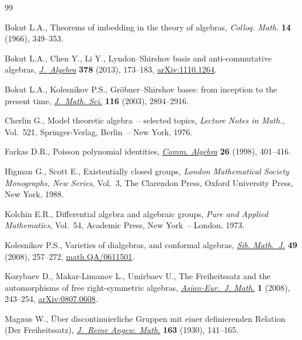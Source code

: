 \documentclass[pdftex]{sigma}
\begin{document}
\begin{thebibliography}{99}
\footnotesize \itemsep=0pt

Bokut L.A., Theorems of imbedding in the theory of algebras, \textit{Colloq.
  Math.} \textbf{14} (1966), 349--353.

Bokut L.A., Chen Y., Li Y., Lyndon--{S}hirshov basis and anti-commutative
  algebras, \href{http://dx.doi.org/10.1016/j.jalgebra.2012.12.017}{\textit{J.~Algebra}} \textbf{378} (2013), 173--183,
  \href{http://arxiv.org/abs/1110.1264}{arXiv:1110.1264}.

Bokut L.A., Kolesnikov P.S., Gr\"obner--{S}hirshov bases: from inception to the
  present time, \href{http://dx.doi.org/10.1023/A:1023490323855}{\textit{J.~Math. Sci.}} \textbf{116} (2003), 2894--2916.

Cherlin G., Model theoretic algebra~-- selected topics, \textit{Lecture Notes
  in Math.}, Vol.~521, Springer-Verlag, Berlin~-- New York, 1976.

Farkas D.R., Poisson polynomial identities, \href{http://dx.doi.org/10.1080/00927879808826136}{\textit{Comm. Algebra}} \textbf{26}
  (1998), 401--416.

Higman G., Scott E., Existentially closed groups, \textit{London Mathematical
  Society Monographs, New Series}, Vol.~3, The Clarendon Press, Oxford
  University Press, New York, 1988.

Kolchin E.R., Dif\/ferential algebra and algebraic groups, \textit{Pure and
  Applied Mathematics}, Vol.~54, Academic Press, New York~-- London, 1973.

Kolesnikov P.S., Varieties of dialgebras, and conformal algebras, \href{http://dx.doi.org/10.1007/s11202-008-0026-8}{\textit{Sib.
  Math.~J.}} \textbf{49} (2008), 257--272, \href{http://arxiv.org/abs/math.QA/0611501}{math.QA/0611501}.

Kozybaev D., Makar-Limanov L., Umirbaev U., The {F}reiheitssatz and the
  automorphisms of free right-symmetric algebras, \href{http://dx.doi.org/10.1142/S1793557108000230}{\textit{Asian-Eur.~J. Math.}}
  \textbf{1} (2008), 243--254, \href{http://arxiv.org/abs/0807.0608}{arXiv:0807.0608}.

Magnus W., \"Uber discontinuierliche Gruppen mit einer def\/inierenden Relation
  (Der Freiheitssatz), \href{http://dx.doi.org/10.1515/crll.1930.163.141}{\textit{J.~Reine Angew. Math.}} \textbf{163} (1930),
  141--165.


\end{thebibliography}
\end{document}
